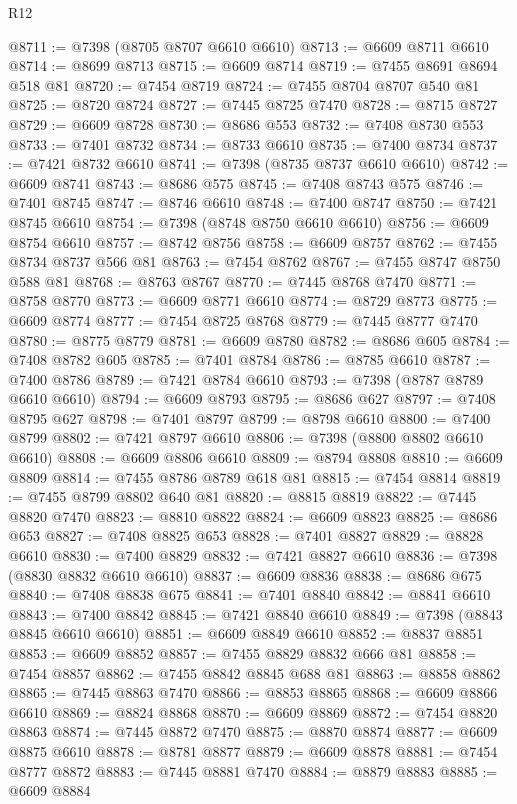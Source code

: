 \begin{lexlean}{R12}
\begin{coremodule}
{{{{{{{{{{{{{{{{{{{{{{{{{{{{{{{{{{{{{{{{{{{{{{{{{{{{{{{{{{{{{{{{{{{{{{{{{{{{{{{{{{@8711 := @7398 (@8705 @8707 @6610 @6610)
@8713 := @6609 @8711 @6610
@8714 := @8699 @8713
@8715 := @6609 @8714
@8719 := @7455 @8691 @8694 @518 @81
@8720 := @7454 @8719
@8724 := @7455 @8704 @8707 @540 @81
@8725 := @8720 @8724
@8727 := @7445 @8725 @7470
@8728 := @8715 @8727
@8729 := @6609 @8728
@8730 := @8686 @553
@8732 := @7408 @8730 @553
@8733 := @7401 @8732
@8734 := @8733 @6610
@8735 := @7400 @8734
@8737 := @7421 @8732 @6610
@8741 := @7398 (@8735 @8737 @6610 @6610)
@8742 := @6609 @8741
@8743 := @8686 @575
@8745 := @7408 @8743 @575
@8746 := @7401 @8745
@8747 := @8746 @6610
@8748 := @7400 @8747
@8750 := @7421 @8745 @6610
@8754 := @7398 (@8748 @8750 @6610 @6610)
@8756 := @6609 @8754 @6610
@8757 := @8742 @8756
@8758 := @6609 @8757
@8762 := @7455 @8734 @8737 @566 @81
@8763 := @7454 @8762
@8767 := @7455 @8747 @8750 @588 @81
@8768 := @8763 @8767
@8770 := @7445 @8768 @7470
@8771 := @8758 @8770
@8773 := @6609 @8771 @6610
@8774 := @8729 @8773
@8775 := @6609 @8774
@8777 := @7454 @8725 @8768
@8779 := @7445 @8777 @7470
@8780 := @8775 @8779
@8781 := @6609 @8780
@8782 := @8686 @605
@8784 := @7408 @8782 @605
@8785 := @7401 @8784
@8786 := @8785 @6610
@8787 := @7400 @8786
@8789 := @7421 @8784 @6610
@8793 := @7398 (@8787 @8789 @6610 @6610)
@8794 := @6609 @8793
@8795 := @8686 @627
@8797 := @7408 @8795 @627
@8798 := @7401 @8797
@8799 := @8798 @6610
@8800 := @7400 @8799
@8802 := @7421 @8797 @6610
@8806 := @7398 (@8800 @8802 @6610 @6610)
@8808 := @6609 @8806 @6610
@8809 := @8794 @8808
@8810 := @6609 @8809
@8814 := @7455 @8786 @8789 @618 @81
@8815 := @7454 @8814
@8819 := @7455 @8799 @8802 @640 @81
@8820 := @8815 @8819
@8822 := @7445 @8820 @7470
@8823 := @8810 @8822
@8824 := @6609 @8823
@8825 := @8686 @653
@8827 := @7408 @8825 @653
@8828 := @7401 @8827
@8829 := @8828 @6610
@8830 := @7400 @8829
@8832 := @7421 @8827 @6610
@8836 := @7398 (@8830 @8832 @6610 @6610)
@8837 := @6609 @8836
@8838 := @8686 @675
@8840 := @7408 @8838 @675
@8841 := @7401 @8840
@8842 := @8841 @6610
@8843 := @7400 @8842
@8845 := @7421 @8840 @6610
@8849 := @7398 (@8843 @8845 @6610 @6610)
@8851 := @6609 @8849 @6610
@8852 := @8837 @8851
@8853 := @6609 @8852
@8857 := @7455 @8829 @8832 @666 @81
@8858 := @7454 @8857
@8862 := @7455 @8842 @8845 @688 @81
@8863 := @8858 @8862
@8865 := @7445 @8863 @7470
@8866 := @8853 @8865
@8868 := @6609 @8866 @6610
@8869 := @8824 @8868
@8870 := @6609 @8869
@8872 := @7454 @8820 @8863
@8874 := @7445 @8872 @7470
@8875 := @8870 @8874
@8877 := @6609 @8875 @6610
@8878 := @8781 @8877
@8879 := @6609 @8878
@8881 := @7454 @8777 @8872
@8883 := @7445 @8881 @7470
@8884 := @8879 @8883
@8885 := @6609 @8884
}}}}}}}}}}}}}}}}}}}}}}}}}}}}}}}}}}}}}}}}}}}}}}}}}}}}}}}}}}}}}}}}}}}}}}}}}}}}}}}}}}
\end{coremodule}
\end{lexlean}
